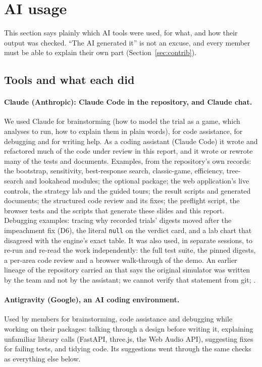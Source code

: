 \section{AI usage}\label{sec:ai}
This section says plainly which AI tools were used, for what, and how their output was checked. ``The AI generated it'' is not an excuse, and every member must be able to explain their own part (Section~\ref{sec:contrib}).

\subsection{Tools and what each did}
\paragraph{Claude (Anthropic): Claude Code in the repository, and Claude chat.} We used Claude for brainstorming (how to model the trial as a game, which analyses to run, how to explain them in plain words), for code assistance, for debugging and for writing help. As a coding assistant (Claude Code) it wrote and refactored much of the code under review in this report, and it wrote or rewrote many of the tests and documents. Examples, from the repository's own records: the bootstrap, sensitivity, best-response search, classic-game, efficiency, tree-search and lookahead modules; the optional  package; the web application's live controls, the strategy lab and the guided tours; the result scripts and generated documents; the structured code review and its fixes; the preflight script, the browser tests and the scripts that generate these slides and this report. Debugging examples: tracing why recorded trials' digests moved after the impeachment fix (D6), the literal \texttt{null} on the verdict card, and a lab chart that disagreed with the engine's exact table. It was also used, in separate sessions, to re-run and re-read the work independently: the full test suite, the pinned digests, a per-area code review and a browser walk-through of the demo. An earlier lineage of the repository carried an  that says the original simulator was written by the team and not by the assistant; we cannot verify that statement from git; .

\paragraph{Antigravity (Google), an AI coding environment.} Used by members for brainstorming, code assistance and debugging while working on their packages: talking through a design before writing it, explaining unfamiliar library calls (FastAPI, three.js, the Web Audio API), suggesting fixes for failing tests, and tidying code. Its suggestions went through the same checks as everything else below.

